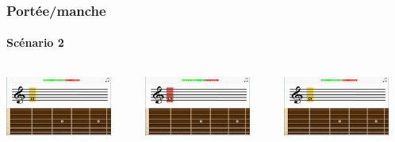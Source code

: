 \documentclass{beamer}
\begin{document}
	\begin{frame}

   		\frametitle{Portée/manche}

       		\framesubtitle{Scénario 2}

	\begin{columns}

	 	\begin{column}{0.33\textwidth}

		\includegraphics[width=3.5cm]{images/portee_question.png}

		\end{column}

	 \begin{column}{0.33\textwidth}

		\includegraphics[width=3.5cm]{images/portee_mauvaise.png}

	\end{column}

	 \begin{column}{0.33\textwidth}

		\includegraphics[width=3.5cm]{images/portee_question.png}

	\end{column}

	\end{columns} 

	\end{frame}




\end{document}
